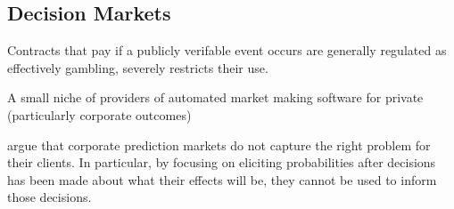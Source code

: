  \cite{mansour2015bayesian}





\subsection{Decision Markets}

Contracts that pay if a publicly verifable event occurs are generally regulated as effectively gambling,  severely restricts their use. 

A small  niche of providers of automated market making software for private (particularly corporate outcomes)



\cite{berg2003prediction,hanson2002decision,othman2010decision,boutilier2012eliciting,chen2014eliciting}



\cite{othman2010decision} argue that corporate prediction markets do not capture the right problem for their clients.
In particular, by focusing on eliciting probabilities after decisions has been made about what their effects will be, they cannot be used to inform those decisions. 

